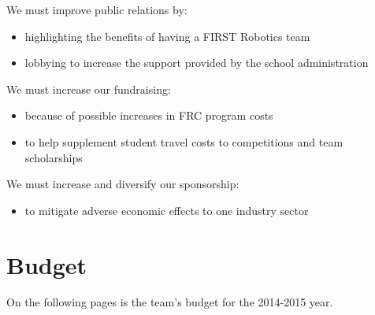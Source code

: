 We must improve public relations by:
\begin{itemize}
	\item highlighting the benefits of having a FIRST Robotics team
	\item lobbying to increase the support provided by the school administration
\end{itemize}

We must increase our fundraising:
\begin{itemize}
	\item because of possible increases in FRC program costs
	\item to help supplement student travel costs to competitions and team scholarships
\end{itemize}

We must increase and diversify our sponsorship:
\begin{itemize}
	\item to mitigate adverse economic effects to one industry sector 
\end{itemize}

\newpage

\section{Budget}
On the following pages is the team's budget for the 2014-2015 year.

